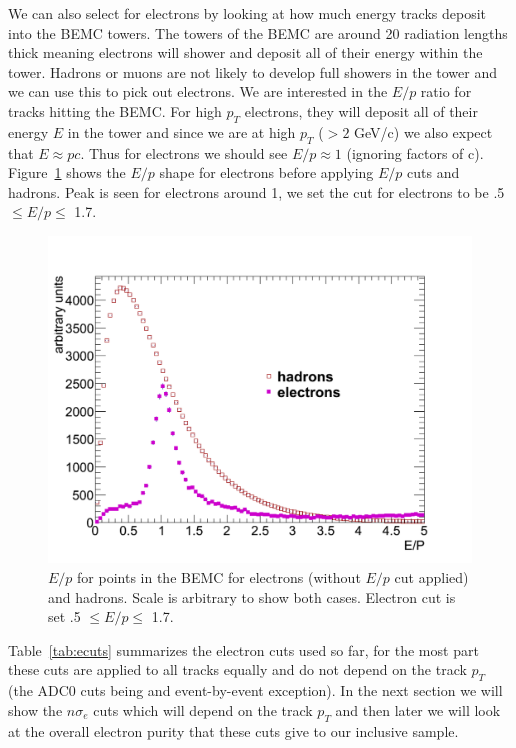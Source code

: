 We can also select for electrons by looking at how much energy tracks deposit into the BEMC towers. The towers of the BEMC are around 20 radiation lengths thick meaning electrons will shower and deposit all of their energy within the tower. Hadrons or muons are not likely to develop full showers in the tower and we can use this to pick out electrons. We are interested in the $E/p$ ratio for tracks hitting the BEMC. For high $p_T$ electrons, they will deposit all of their energy $E$ in the tower and since we are at high $p_T$ ($> 2$ GeV/c) we also expect that $E \approx pc$. Thus for electrons we should see $E/p \approx 1$ (ignoring factors of c). Figure~\ref{fig:EOP} shows the $E/p$ shape for electrons before applying $E/p$ cuts and hadrons. Peak is seen for electrons around 1, we set the cut for electrons to be .5 $\leq E/p \leq$ 1.7.

\begin{figure}[htbp]
\begin{center}
\includegraphics[scale=.58]{Plots/NPE/EOP_plot.pdf}
\end{center}
\caption[$E/p$ in BEMC]{$E/p$ for points in the BEMC for electrons (without $E/p$ cut applied) and hadrons. Scale is arbitrary to show both cases. Electron cut is set .5 $\leq E/p \leq$ 1.7.}
\label{fig:EOP}
\end{figure}

Table~\ref{tab:ecuts} summarizes the electron cuts used so far, for the most part these cuts are applied to all tracks equally and do not depend on the track $p_T$ (the ADC0 cuts being and event-by-event exception). In the next section we will show the $n\sigma_e$ cuts which will depend on the track $p_{T}$ and then later we will look at the overall electron purity that these cuts give to our inclusive sample.

